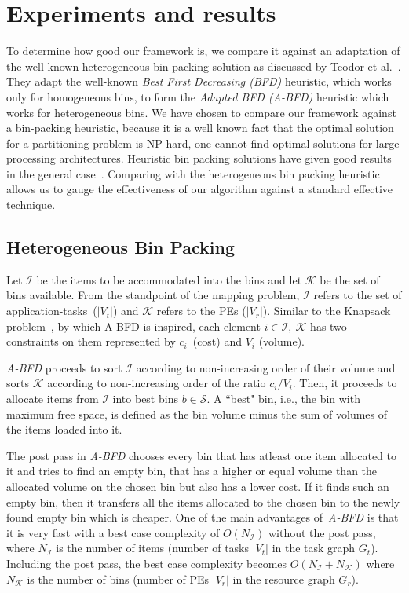 \section{Experiments and results}
\label{sec:experiments-results}

To determine how good our framework is, we compare it against an
adaptation of the well known heterogeneous bin packing solution as
discussed by Teodor et al.~\cite{tcra11}. They adapt the well-known
\textit{Best First Decreasing (BFD)} heuristic, which works only for
homogeneous bins, to form the \textit{Adapted BFD (A-BFD)} heuristic
which works for heterogeneous bins. We have chosen to compare our
framework against a bin-packing heuristic, because it is a well known
fact that the optimal solution for a partitioning problem is NP hard,
one cannot find optimal solutions for large processing
architectures. Heuristic bin packing solutions have given good results
in the general case~\cite{ecof78}. Comparing with the heterogeneous bin
packing heuristic allows us to gauge the effectiveness of our algorithm
against a standard effective technique.

\subsection{Heterogeneous Bin Packing}

Let $\mathcal{I}$ be the items to be accommodated into the bins and let
$\mathcal{K}$ be the set of bins available.  From the standpoint of the
mapping problem, $\mathcal{I}$ refers to the set of
\mbox{application-tasks ($|V_t|$)} and $\mathcal{K}$ refers to the PEs
($|V_r|$). Similar to the Knapsack problem~\cite{sski08}, by which A-BFD
is inspired, each element $i \in \mathcal{I},\ \mathcal{K}$ has two
constraints on them represented by \mbox{$c_i$ (cost)} and $V_i$
(volume). 

\textit{A-BFD} proceeds to sort $\mathcal{I}$ according to
non-increasing order of their volume and sorts $\mathcal{K}$ according
to non-increasing order of the ratio $c_i/V_i$. Then, it proceeds to
allocate items from $\mathcal{I}$ into best bins $b \in \mathcal{S}$. A
``best" bin, i.e., the bin with maximum free space, is defined as the
bin volume minus the sum of volumes of the items loaded into
it. 

The post pass in \textit{A-BFD} chooses every bin that has atleast one
item allocated to it and tries to find an empty bin, that has a higher
or equal volume than the allocated volume on the chosen bin but also has
a lower cost. If it finds such an empty bin, then it transfers all the
items allocated to the chosen bin to the newly found empty bin which is
cheaper. One of the main advantages of\ \textit{A-BFD} is that it is
very fast with a best case complexity of $O(N_\mathcal{I})$ without the
post pass, where $N_\mathcal{I}$ is the number of items (number of tasks
$|V_t|$ in the task graph $G_t$). Including the post pass, the best case
complexity becomes $O(N_\mathcal{I} + N_\mathcal{K})$ where
$N_\mathcal{K}$ is the number of bins (number of PEs $|V_r|$ in the
resource graph $G_r$).

